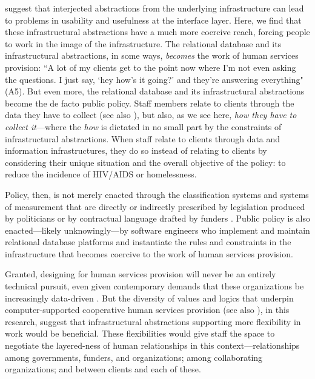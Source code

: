 \citet{Edwards2010InfraProb} suggest that interjected abstractions from the underlying infrastructure can lead to problems in usability and usefulness at the interface layer. Here, we find that these infrastructural abstractions have a much more coercive reach, forcing people to work in the image of the infrastructure. The relational database and its infrastructural abstractions, in some ways, \textit{becomes} the work of human services provision: ``A lot of my clients get to the point now where I'm not even asking the questions. I just say, `hey how's it going?' and they're answering everything" (A5). But even more, the relational database and its infrastructural abstractions become the de facto public policy.  Staff members relate to clients through the data they have to collect (see also \citep{Soss2011Discipline}), but also, as we see here, \textit{how they have to collect it}---where the \textit{how} is dictated in no small part by the constraints of infrastructural abstractions. When staff relate to clients through data and information infrastructures, they do so instead of relating to clients by considering their unique situation and the overall objective of the policy: to reduce the incidence of HIV/AIDS or homelessness.  

Policy, then, is not merely enacted through the classification systems and systems of measurement that are directly or indirectly prescribed by legislation produced by politicians or by contractual language drafted by funders \citep{Soss2011Discipline}. Public policy is also enacted---likely unknowingly---by software engineers who implement and maintain relational database platforms and instantiate the rules and constraints in the infrastructure that becomes coercive to the work of human services provision.

Granted, designing for human services provision will never be an entirely technical pursuit, even given contemporary demands that these organizations be increasingly data-driven \citep{Haskins2011Building, Bopp2017DbD, Harmon2017Fictions}. But the diversity of values and logics that underpin computer-supported cooperative human services provision (see also \citep{Voida2014SharedValues}), in this research, suggest that infrastructural abstractions supporting more flexibility in work would be beneficial. These flexibilities would give staff the space to negotiate the layered-ness of human relationships in this context---relationships among governments, funders, and organizations; among collaborating organizations; and between clients and each of these. 

